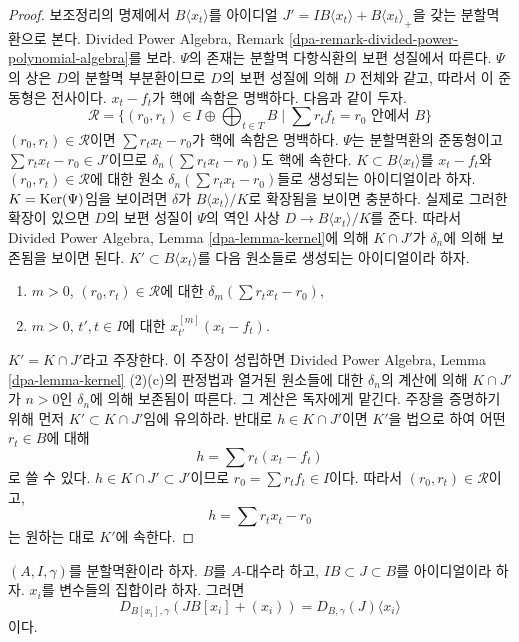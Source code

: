 \begin{proof}
보조정리의 명제에서 $B\langle x_t \rangle$를 아이디얼
$J' = IB\langle x_t \rangle + B\langle x_t \rangle_{+}$을 갖는
분할멱환으로 본다. Divided Power Algebra, Remark
\ref{dpa-remark-divided-power-polynomial-algebra}를 보라.
$\Psi$의 존재는 분할멱 다항식환의 보편 성질에서 따른다.
$\Psi$의 상은 $D$의 분할멱 부분환이므로 $D$의 보편 성질에 의해
$D$ 전체와 같고, 따라서 이 준동형은 전사이다.
$x_t - f_t$가 핵에 속함은 명백하다. 다음과 같이 두자.
$$
\mathcal{R} = \{(r_0, r_t) \in I \oplus \bigoplus\nolimits_{t \in T} B
\mid \sum r_t f_t = r_0 \text{ 안에서 }B\}
$$
$(r_0, r_t) \in \mathcal{R}$이면 $\sum r_t x_t - r_0$가 핵에 속함은
명백하다. $\Psi$는 분할멱환의 준동형이고
$\sum r_tx_t - r_0 \in J'$이므로
$\delta_n(\sum r_t x_t - r_0)$도 핵에 속한다.
$K \subset B\langle x_t \rangle$를 $x_t - f_t$와
$(r_0, r_t) \in \mathcal{R}$에 대한 원소
$\delta_n(\sum r_t x_t - r_0)$들로 생성되는 아이디얼이라 하자.
$K = \mathop{\mathrm{Ker}}(\Psi)$임을 보이려면 $\delta$가
$B\langle x_t \rangle/K$로 확장됨을 보이면 충분하다.
실제로 그러한 확장이 있으면 $D$의 보편 성질이 $\Psi$의 역인 사상
$D \to B\langle x_t \rangle/K$를 준다. 따라서
Divided Power Algebra, Lemma \ref{dpa-lemma-kernel}에 의해
$K \cap J'$가 $\delta_n$에 의해 보존됨을 보이면 된다.
$K' \subset B\langle x_t \rangle$를 다음 원소들로 생성되는
아이디얼이라 하자.
\begin{enumerate}
\item $m > 0$, $(r_0, r_t) \in \mathcal{R}$에 대한
$\delta_m(\sum r_t x_t - r_0)$,
\item $m > 0$, $t', t \in I$에 대한 $x_{t'}^{[m]}(x_t - f_t)$.
\end{enumerate}
$K' = K \cap J'$라고 주장한다. 이 주장이 성립하면
Divided Power Algebra, Lemma \ref{dpa-lemma-kernel} (2)(c)의 판정법과
열거된 원소들에 대한 $\delta_n$의 계산에 의해 $K \cap J'$가
$n > 0$인 $\delta_n$에 의해 보존됨이 따른다. 그 계산은 독자에게 맡긴다.
주장을 증명하기 위해 먼저 $K' \subset K \cap J'$임에 유의하라.
반대로 $h \in K \cap J'$이면 $K'$을 법으로 하여 어떤 $r_t \in B$에 대해
$$
h = \sum r_t (x_t - f_t)
$$
로 쓸 수 있다. $h \in K \cap J' \subset J'$이므로
$r_0 = \sum r_t f_t \in I$이다. 따라서
$(r_0, r_t) \in \mathcal{R}$이고,
$$
h = \sum r_t x_t - r_0
$$
는 원하는 대로 $K'$에 속한다.
\end{proof}

\begin{lemma}
\label{lemma-divided-power-envelope-add-variables}
$(A, I, \gamma)$를 분할멱환이라 하자.
$B$를 $A$-대수라 하고, $IB \subset J \subset B$를 아이디얼이라 하자.
$x_i$를 변수들의 집합이라 하자. 그러면
$$
D_{B[x_i], \gamma}(JB[x_i] + (x_i)) = D_{B, \gamma}(J) \langle x_i \rangle
$$
이다.
\end{lemma}

